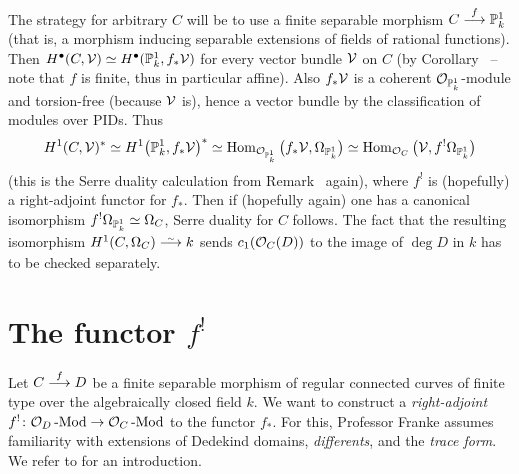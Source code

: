 \documentclass[a4paper,parskip=half,numbers=enddot, DIV=12]{scrreprt}
\begin{document}
The strategy for arbitrary $C$ will be to use a finite separable morphism $C\morphism[f]\IP_k^1$ (that is, a morphism inducing separable extensions of fields of rational functions). Then $H^\bullet(C,\mathcal{V})\simeq H^\bullet (\mathbb{P}_k^1,f_*\mathcal{V})$ for every vector bundle $\mathcal{V}$ on $C$ (by Corollary~ -- note that $f$ is finite, thus in particular affine). Also $f_*\mathcal{V}$ is a coherent $\mathcal{O}_{\mathbb{P}_k^1}$-module and torsion-free (because $\mathcal{V}$ is), hence a vector bundle by the classification of modules over PIDs. Thus 
\begin{align*}
	H^1(C,\mathcal{V})^*\simeq H^1\big(\mathbb{P}_k^1,f_*\mathcal{V}\big)^*\simeq \operatorname{Hom}_{\mathcal{O}_{\mathbb{P}_k^1}}\big(f_*\mathcal{V},\Omega_{\mathbb{P}_k^1}\big)\simeq \operatorname{Hom}_{\mathcal{O}_C}\big(\mathcal{V},f^!\Omega_{\mathbb{P}_k^1}\big)
\end{align*}
 (this is the Serre duality calculation from Remark~ again), where $f^!$ is (hopefully) a right-adjoint functor for $f_*$. Then if (hopefully again) one has a canonical isomorphism $f^!\Omega_{\mathbb{P}_k^1}\simeq \Omega_C$, Serre duality for $C$ follows. The fact that the resulting isomorphism $H^1(C,\Omega_C)\isomorphism k$ sends $c_1(\mathcal{O}_C(D))$ to the image of $\deg D$ in $k$ has to be checked separately.

\section{The functor \texorpdfstring{$f^!$}{f}}
Let $C\morphism[f]D$ be a finite separable morphism of regular connected curves of finite type over the algebraically closed field $k$. We want to construct a \emph{right-adjoint} $f^!\colon\Oo_D\cat{-Mod}\morphism\Oo_C\cat{-Mod}$ to the functor $f_*$. For this, Professor Franke assumes familiarity with extensions of Dedekind domains, \emph{differents}, and the \emph{trace form}. We refer to \cite[Ch.~III, \S 2]{NEUKIRCH} for an introduction.
\end{document}
